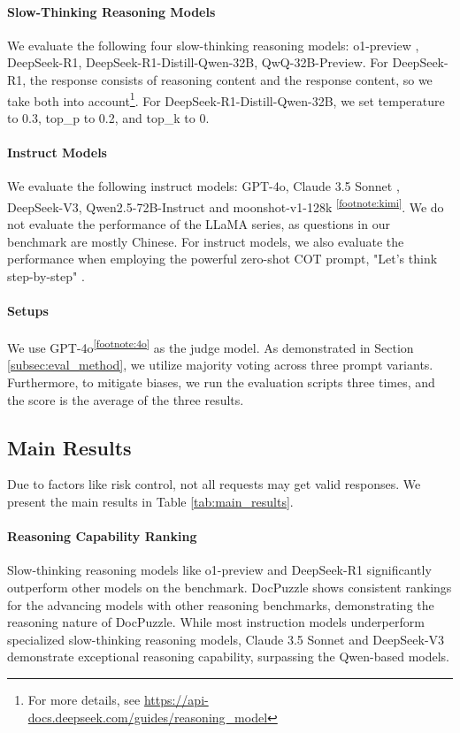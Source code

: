 \paragraph{Slow-Thinking Reasoning Models} We evaluate the following four slow-thinking reasoning models: 
o1-preview \cite{openai_o1preview}, DeepSeek-R1\cite{deepseekai2025deepseekr1incentivizingreasoningcapability}, DeepSeek-R1-Distill-Qwen-32B\cite{deepseekai2025deepseekr1incentivizingreasoningcapability}, QwQ-32B-Preview\cite{qwq-32b-preview}.
For DeepSeek-R1, the response consists of reasoning content and the response content, so we take both into account\footnote{For more details, see \url{https://api-docs.deepseek.com/guides/reasoning_model}}.
For DeepSeek-R1-Distill-Qwen-32B, we set temperature to 0.3, top\_p to 0.2, and top\_k to 0.

\paragraph{Instruct Models} We evaluate the following instruct models: GPT-4o\cite{openai_gpt4o}, Claude 3.5 Sonnet \cite{claude35}, DeepSeek-V3\cite{deepseekai2024deepseekv3technicalreport}, Qwen2.5-72B-Instruct\cite{qwen2.5} and moonshot-v1-128k \textsuperscript{\ref{footnote:kimi}}.
We do not evaluate the performance of the LLaMA series, as questions in our benchmark are mostly Chinese.
For instruct models, we also evaluate the performance when employing the powerful zero-shot COT prompt, "Let's think step-by-step" \cite{kojima2023largelanguagemodelszeroshot}.
\paragraph{Setups} We use GPT-4o\textsuperscript{\ref{footnote:4o}} as the judge model.
As demonstrated in Section \ref{subsec:eval_method}, we utilize majority voting across three prompt variants.
Furthermore, to mitigate biases, we run the evaluation scripts three times, and the score is the average of the three results.


\subsection{Main Results}
Due to factors like risk control, not all requests may get valid responses.
We present the main results in Table \ref{tab:main_results}.
\paragraph{Reasoning Capability Ranking}
Slow-thinking reasoning models like o1-preview and DeepSeek-R1 significantly outperform other models on the benchmark.
DocPuzzle shows consistent rankings for the advancing models with other reasoning benchmarks, demonstrating the reasoning nature of DocPuzzle.
While most instruction models underperform specialized slow-thinking reasoning models, Claude 3.5 Sonnet and DeepSeek-V3 demonstrate exceptional reasoning capability, surpassing the Qwen-based models.


